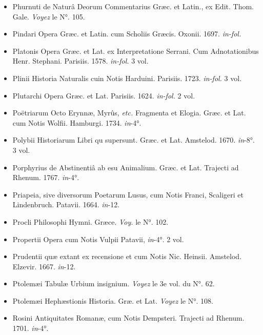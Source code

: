 \documentclass[a4paper, 18pt, oneside]{article}
\begin{document}
\begin{itemize}
    \item Phurnuti de Naturâ Deorum Commentarius Græc. et Latin., ex Edit. Thom. Gale. \emph{Voyez} le N°. 105.

    \item Pindari Opera Græc. et Latin. cum Scholiis Græcis. Oxonii. 1697. \emph{in-fol.}

    \item Platonis Opera Græc. et Lat. ex Interpretatione Serrani. Cum Adnotationibus Henr. Stephani. Parisiis. 1578. \emph{in-fol.} 3 vol.

    \item Plinii Historia Naturalis cuin Notis Harduini. Parisiis. 1723. \emph{in-fol.} 3 vol.

    \item Plutarchi Opera Græc. et Lat. Parisiis. 1624. \emph{in-fol.} 2 vol.

    \item Poëtriarum Octo Erynnæ, Myrûs, \emph{etc.} Fragmenta et Elogia. Græc. et Lat. cum Notis Wolfii. Hamburgi. 1734. \emph{in}-4°.

    \item Polybii Historiarum Libri qu supersunt. Græc. et Lat. Amstelod. 1670. \emph{in}-8°. 3 vol.

    \item Porphyrius de Abstinentiâ ab esu Animalium. Græc. et Lat. Trajecti ad Rhenum. 1767. \emph{in}-4°.

    \item Priapeia, sive diversorum Poetarum Lusus, cum Notis Franci, Scaligeri et Lindenbruch. Patavii. 1664. \emph{in}-12.

    \item Procli Philosophi Hymni. Græce. \emph{Voy.} le N°. 102.

    \item Propertii Opera cum Notis Vulpii Patavii, \emph{in}-4°. 2 vol.

    \item Prudentii quæ extant ex recensione et cum Notis Nic. Heinsii. Amstelod. Elzevir. 1667. \emph{in}-12.

    \item Ptolemæi Tabulæ Urbium insignium. \emph{Voyez} le 3e vol. du N°. 62.

    \item Ptolemæi Hephæstionis Historia. Græ. et Lat. \emph{Voyez} le N°. 108.

    \item Rosini Antiquitates Romanæ, cum Notis Dempsteri. Trajecti ad Rhenum. 1701. \emph{in}-4°. 


\end{itemize}
\end{document}

